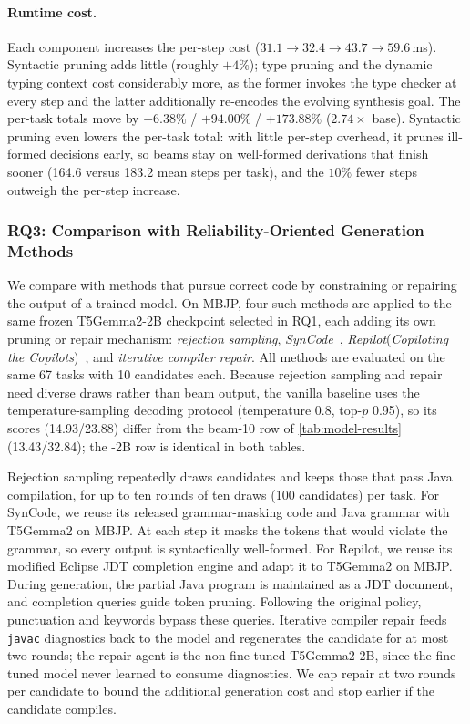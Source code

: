 \paragraph{Runtime cost.}
Each component increases the per-step cost ($31.1 \to 32.4 \to 43.7 \to 59.6$\,ms).
Syntactic pruning adds little (roughly $+4\%$); type pruning and the dynamic typing context cost considerably more, as the former invokes the type checker at every step and the latter additionally re-encodes the evolving synthesis goal.
The per-task totals move by $-6.38\%$ / $+94.00\%$ / $+173.88\%$ ($2.74\times$ base).
Syntactic pruning even lowers the per-task total: with little per-step overhead, it prunes ill-formed decisions early, so beams stay on well-formed derivations that finish sooner (164.6 versus 183.2 mean steps per task), and the $10\%$ fewer steps outweigh the per-step increase.

\subsubsection{RQ3: Comparison with Reliability-Oriented Generation Methods}
We compare \mainname{} with methods that pursue correct code by constraining or repairing the output of a trained model.
On MBJP, four such methods are applied to the same frozen T5Gemma2-2B checkpoint selected in RQ1, each adding its own pruning or repair mechanism: \emph{rejection sampling}, \emph{SynCode}~\cite{ugare2024syncodellmgenerationgrammar}, \emph{Repilot}(\emph{Copiloting the Copilots})~\cite{DBLP:conf/sigsoft/0003X023}, and \emph{iterative compiler repair}.
All methods are evaluated on the same 67 tasks with 10 candidates each.
Because rejection sampling and repair need diverse draws rather than beam output, the vanilla baseline uses the temperature-sampling decoding protocol (temperature 0.8, top-$p$ 0.95), so its scores (14.93/23.88) differ from the beam-10 row of \autoref{tab:model-results} (13.43/32.84); the \mainname-2B row is identical in both tables.

Rejection sampling repeatedly draws candidates and keeps those that pass Java compilation, for up to ten rounds of ten draws (100 candidates) per task.
For SynCode, we reuse its released grammar-masking code and Java grammar with T5Gemma2 on MBJP. At each step it masks the tokens that would violate the grammar, so every output is syntactically well-formed.
For Repilot, we reuse its modified Eclipse JDT completion engine and adapt it to T5Gemma2 on MBJP. During generation, the partial Java program is maintained as a JDT document, and completion queries guide token pruning. Following the original policy, punctuation and keywords bypass these queries.
Iterative compiler repair feeds \texttt{javac} diagnostics back to the model and regenerates the candidate for at most two rounds; the repair agent is the non-fine-tuned T5Gemma2-2B, since the fine-tuned model never learned to consume diagnostics. We cap repair at two rounds per candidate to bound the additional generation cost and stop earlier if the candidate compiles.

